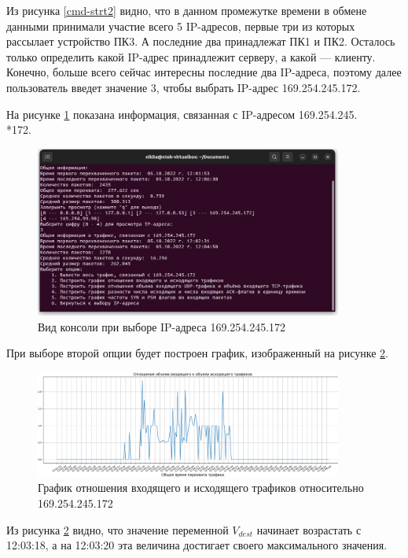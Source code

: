 \documentclass[bachelor, och, coursework]{SCWorks}
\begin{document}
  Из рисунка \ref{cmd-strt2} видно, что в данном промежутке времени в обмене данными принимали участие всего 5 IP-адресов, первые три из которых рассылает
  устройство ПК3. А последние два принадлежат ПК1 и ПК2. Осталось только определить какой IP-адрес принадлежит серверу, а какой --- клиенту. Конечно, больше
  всего сейчас интересны последние два IP-адреса, поэтому далее пользователь введет значение 3, чтобы выбрать IP-адрес 169.254.245.172.

  На рисунке \ref{chmod} показана информация, связанная с IP-адресом 169.254.245.\\*172.

  \begin{figure}[H]
    \centering
    \includegraphics[width=0.9\textwidth]{photo/choose-mode.jpg}
    \caption{Вид консоли при выборе IP-адреса 169.254.245.172}
    \label{chmod}
  \end{figure}

  При выборе второй опции будет построен график, изображенный на рисунке \ref{serv1}.

  \begin{figure}[H]
    \centering
    \includegraphics[width=0.9\textwidth]{photo/serv-1.png}
    \caption{График отношения входящего и исходящего трафиков относительно 169.254.245.172}
    \label{serv1}
  \end{figure}

  Из рисунка \ref{serv1} видно, что значение переменной $V_{dest}$ начинает возрастать с 12:03:18, а на 12:03:20 эта величина достигает
  своего максимального значения.
\end{document}
